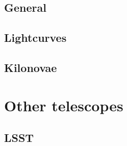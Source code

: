 \documentclass[twocolumn]{aastex631}
\newcommand{\placeholder}[1]{{\color{gray} \lipsum[#1]}}
\begin{document}
\subsection{General}
\citet{Gompertz+2020}
\placeholder{5}

\subsection{Lightcurves}
\citet{Burhanudin+2021}
\placeholder{6}

\subsection{Kilonovae}
\citet{Chase+2022}
\placeholder{7}

\section{Other telescopes}
\subsection{LSST}
\citet{Andreoni+2022}
\placeholder{8}


{}
\end{document}
